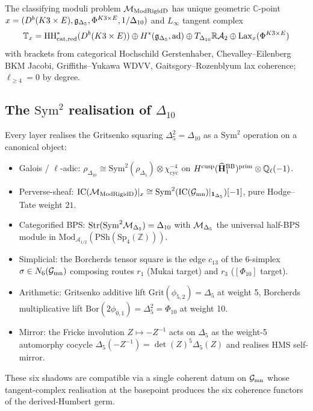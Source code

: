 The classifying moduli problem $\mathcal{M}_{\mathrm{ModRigidD}}$ has unique geometric
$\mathbb{C}$-point $x = (D^b(K3 \times E), \mathfrak{g}_{\Delta_5}, \Phi^{K3\times E}, 1/\Delta_{10})$
and $L_\infty$ tangent complex
\[
\mathbb{T}_x = \mathrm{HH}^*_{\mathrm{cat,red}}(D^b(K3\times E))
\oplus H^*(\mathfrak{g}_{\Delta_5}, \mathrm{ad})
\oplus T_{\Delta_{10}} \mathbb{R}\mathcal{A}_2
\oplus \mathrm{Lax}_x(\Phi^{K3\times E})
\]
with brackets from categorical Hochschild Gerstenhaber,
Chevalley--Eilenberg BKM Jacobi, Griffiths--Yukawa WDVV,
Gaitsgory--Rozenblyum lax coherence; $\ell_{\geq 4} = 0$ by degree.

\subsection{The $\mathrm{Sym}^2$ realisation of $\Delta_{10}$}

Every layer realises the Gritsenko squaring $\Delta_5^2 = \Delta_{10}$
as a $\mathrm{Sym}^2$ operation on a canonical object:
\begin{itemize}
\item Galois / $\ell$-adic: $\rho_{\Delta_{10}} \cong \mathrm{Sym}^2(\rho_{\Delta_5}) \otimes \chi_{\mathrm{cyc}}^{-4}$ on $H^{\mathrm{cusp}}(\widehat{\mathbf{H}}_1^{\mathrm{BB}})^{\mathrm{prim}} \otimes \mathbb{Q}_\ell(-1)$.
\item Perverse-sheaf: $\mathrm{IC}(\mathcal{M}_{\mathrm{ModRigidD}})|_x \cong \mathrm{Sym}^2(\mathrm{IC}(\mathcal{G}_{\mathrm{mn}})|_{\mathbf{1}_{\Delta_5}})[-1]$, pure Hodge--Tate weight $21$.
\item Categorified BPS: $\mathrm{Str}(\mathrm{Sym}^2 \mathcal{M}_{\Delta_5}) = \Delta_{10}$ with $\mathcal{M}_{\Delta_5}$ the universal half-BPS module in $\mathrm{Mod}_{\mathcal{A}_{1/2}}(\mathrm{PSh}(\mathrm{Sp}_4(\mathbb{Z})))$.
\item Simplicial: the Borcherds tensor square is the edge $c_{13}$ of the 6-simplex $\sigma \in N_6(\mathcal{G}_{\mathrm{mn}})$ composing routes $r_1$ (Mukai target) and $r_3$ ($[\Phi_{10}]$ target).
\item Arithmetic: Gritsenko additive lift $\mathrm{Grit}(\phi_{5,2}) = \Delta_5$ at weight 5, Borcherds multiplicative lift $\mathrm{Bor}(2\phi_{0,1}) = \Delta_5^2 = \Phi_{10}$ at weight 10.
\item Mirror: the Fricke involution $Z \mapsto -Z^{-1}$ acts on $\Delta_5$ as the weight-5 automorphy cocycle $\Delta_5(-Z^{-1}) = \det(Z)^5 \Delta_5(Z)$ and realises HMS self-mirror.
\end{itemize}
These six shadows are compatible via a single coherent datum on $\mathcal{G}_{\mathrm{mn}}$
whose tangent-complex realisation at the basepoint produces the six coherence
functors of the derived-Humbert germ.

